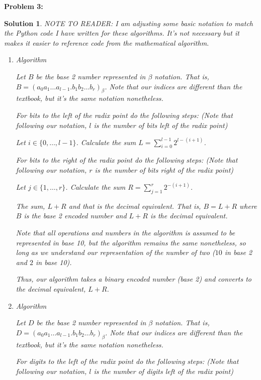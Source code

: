 \documentclass[12pt, letterpaper]{article}
\theoremstyle{nonumberplain}
\newtheorem{sol}{Solution}
\begin{document}
\hspace{18pt}\textbf{Problem 3:} \medskip
\begin{sol}
	NOTE TO READER: I am adjusting some basic notation to match the Python code I have written for these algorithms. It's not necessary but it makes it easier to reference code from the mathematical algorithm.
	\begin{enumerate}[label=\alph*)]
		\item Algorithm

		      Let $B$ be the base 2 number represented in $\beta$ notation. That is, $B = (a_0 a_1 \ldots a_{l-1}.b_1 b_2 \ldots b_r)_\beta$. Note that our indices are different than the textbook, but it's the same notation nonetheless.

		      For bits to the left of the radix point do the following steps: (Note that following our notation, $l$ is the number of bits left of the radix point)

		      Let $i\in \{0, \ldots, l-1\}$. Calculate the sum $L = \sum_{i=0}^{l-1}2^{l - (i+1)}$.

		      For bits to the right of the radix point do the following steps: (Note that following our notation, $r$ is the number of bits right of the radix point)

		      Let $j\in \{1, \ldots, r\}$. Calculate the sum $R = \sum_{j=1}^r 2^{-(i+1)}$.

		      The sum, $L+R$ and that is the decimal equivalent. That is, $B = L+R$ where $B$ is the base 2 encoded number and $L+R$ is the decimal equivalent.

		      Note that all operations and numbers in the algorithm is assumed to be represented in base 10, but the algorithm remains the same nonetheless, so long as we understand our representation of the number of two ($10$ in base 2 and $2$ in base 10).

		      Thus, our algorithm takes a binary encoded number (base 2) and converts to the decimal equivalent, $L+R$.


		\item Algorithm

		      Let $D$ be the base 2 number represented in $\beta$ notation. That is, $D = (a_0 a_1 \ldots a_{l-1}.b_1 b_2 \ldots b_r)_\beta$. Note that our indices are different than the textbook, but it's the same notation nonetheless.

		      For digits to the left of the radix point do the following steps: (Note that following our notation, $l$ is the number of digits left of the radix point)


\end{enumerate}
\end{sol}
\end{document}
